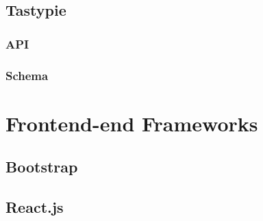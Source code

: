 \subsection{Tastypie}
\label{sub-sec:tastypie}

\subsubsection{API}


\subsubsection{Schema}



\section{Frontend-end Frameworks}
\label{sec:frontend}

\subsection{Bootstrap}
\label{sub-sec:bootstrap}


\subsection{React.js}
\label{sub-sec:react}

